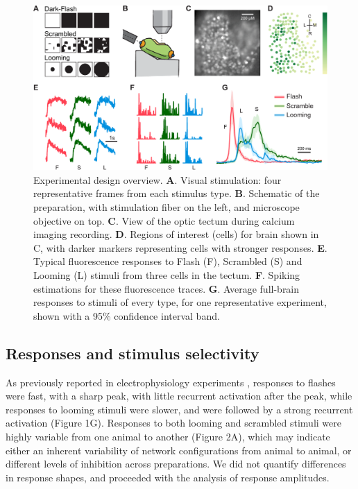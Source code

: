 \documentclass{article}
\begin{document}
\begin{figure}[t!]
\includegraphics[width=\linewidth]{fig1.pdf}
\caption{
Experimental design overview. \textbf{A}. Visual stimulation: four representative frames from each stimulus type. \textbf{B}. Schematic of the preparation, with stimulation fiber on the left, and microscope objective on top. \textbf{C}. View of the optic tectum during calcium imaging recording. \textbf{D}. Regions of interest (cells) for brain shown in C, with darker markers representing cells with stronger responses. \textbf{E}. Typical fluorescence responses to Flash (F), Scrambled (S) and Looming (L) stimuli from three cells in the tectum. \textbf{F}. Spiking estimations for these fluorescence traces. \textbf{G}. Average full-brain responses to stimuli of every type, for one representative experiment, shown with a 95\% confidence interval band. }
\end{figure}

\subsection*{Responses and stimulus selectivity}

As previously reported in electrophysiology experiments \citep{khakhalin2014}, responses to flashes were fast, with a sharp peak, with little recurrent activation after the peak, while responses to looming stimuli were slower, and were followed by a strong recurrent activation (Figure 1G). Responses to both looming and scrambled stimuli were highly variable from one animal to another (Figure 2A), which may indicate either an inherent variability of network configurations from animal to animal, or different levels of inhibition across preparations. We did not quantify differences in response shapes, and proceeded with the analysis of response amplitudes.
\end{document}

